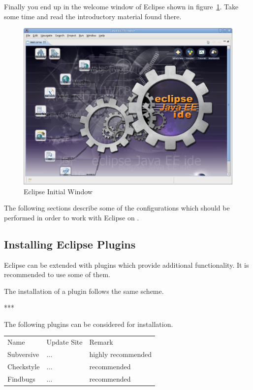 Finally you end up in the welcome window of Eclipse shown in
figure~\ref{fig:eclipse-welcome}. Take some time and read the
introductory material found there.
\begin{figure}[h]
  \centering  \includegraphics[scale=.33]{image/eclipse-welcome}
  \caption{Eclipse Initial Window}\label{fig:eclipse-welcome}
\end{figure}

The following sections describe some of the configurations which
should be performed in order to work with Eclipse on \ExTeX.


\subsection{Installing Eclipse Plugins}

Eclipse can be extended with plugins which provide additional
functionality. It is recommended to use some of them.

The installation of a plugin follows the same scheme.

***

The following plugins can be considered for installation.

\begin{tabular}{lll}
  Name & Update Site & Remark \\
  Subversive & ... & highly recommended \\
  Checkstyle & ... & recommended \\
  Findbugs   & ... & recommended \\
\end{tabular}


